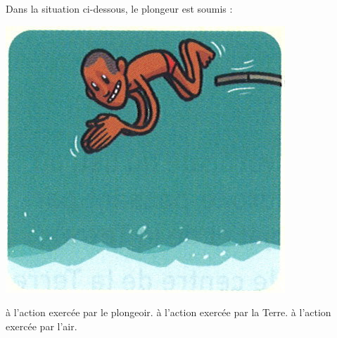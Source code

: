 \begin{questions}
\begin{multicols}{2}
	\end{multicols}

	\question[1] Dans la situation ci-dessous, le plongeur est soumis :
	
	\begin{multicols}{2}
		
		
		\begin{center}
			\includegraphics[scale=0.3]{plong}
		\end{center}
		\begin{checkboxes}
			\choice à l'action exercée par le plongeoir.
			\choice à l'action exercée par la Terre.
			\choice à l'action exercée par l'air.
		\end{checkboxes}
	\end{multicols}

\end{questions}